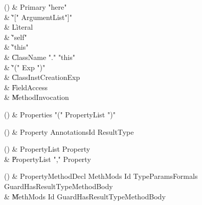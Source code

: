 \begin{bbgrammarappendix}

() & Primary \label{prod:Primary}  \: \xcd"here"  \\

 &    \| \xcd"[" ArgumentList\opt \xcd"]" \\
 &    \| Literal \\
 &    \| \xcd"self" \\
 &    \| \xcd"this" \\
 &    \| ClassName \xcd"." \xcd"this" \\
 &    \| \xcd"(" Exp \xcd")" \\
 &    \| ClassInstCreationExp \\
 &    \| FieldAccess \\
 &    \| MethodInvocation \\

\end{bbgrammarappendix}

\begin{bbgrammarappendix}

() & Properties \label{prod:Properties}  \: \xcd"(" PropertyList \xcd")"  \\


\end{bbgrammarappendix}

\begin{bbgrammarappendix}

() & Property \label{prod:Property}  \: Annotations\opt Id ResultType  \\


\end{bbgrammarappendix}

\begin{bbgrammarappendix}

() & PropertyList \label{prod:PropertyList}  \: Property  \\

 &    \| PropertyList \xcd"," Property \\

\end{bbgrammarappendix}

\begin{bbgrammarappendix}

() & PropertyMethodDecl \label{prod:PropertyMethodDecl}  \: MethMods Id TypeParams\opt Formals Guard\opt HasResultType\opt MethodBody  \\

 &    \| MethMods Id Guard\opt HasResultType\opt MethodBody \\

\end{bbgrammarappendix}

